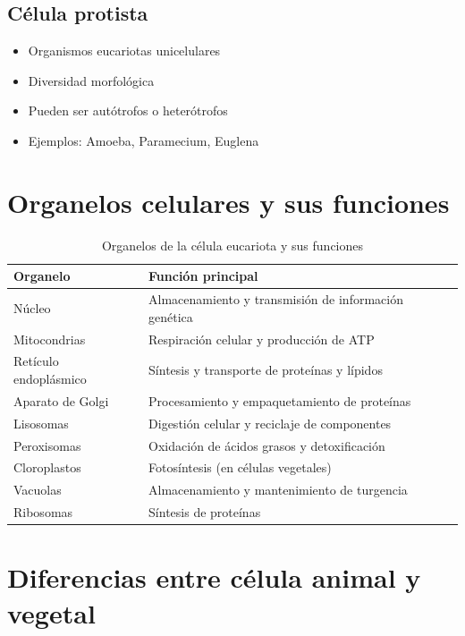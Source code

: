 \subsection{Célula protista}
\begin{itemize}
    \item Organismos eucariotas unicelulares
    \item Diversidad morfológica
    \item Pueden ser autótrofos o heterótrofos
    \item Ejemplos: Amoeba, Paramecium, Euglena
\end{itemize}

\section{Organelos celulares y sus funciones}

\begin{table}[h]
\centering
\begin{tabular}{|l|p{6cm}|}
\hline
\textbf{Organelo} & \textbf{Función principal} \\
\hline
Núcleo & Almacenamiento y transmisión de información genética \\
\hline
Mitocondrias & Respiración celular y producción de ATP \\
\hline
Retículo endoplásmico & Síntesis y transporte de proteínas y lípidos \\
\hline
Aparato de Golgi & Procesamiento y empaquetamiento de proteínas \\
\hline
Lisosomas & Digestión celular y reciclaje de componentes \\
\hline
Peroxisomas & Oxidación de ácidos grasos y detoxificación \\
\hline
Cloroplastos & Fotosíntesis (en células vegetales) \\
\hline
Vacuolas & Almacenamiento y mantenimiento de turgencia \\
\hline
Ribosomas & Síntesis de proteínas \\
\hline
\end{tabular}
\caption{Organelos de la célula eucariota y sus funciones}
\end{table}

\section{Diferencias entre célula animal y vegetal}

